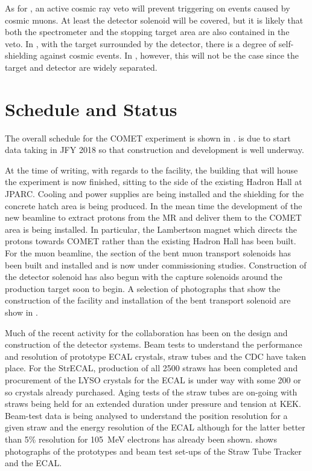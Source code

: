 As for \phaseI, an active cosmic ray veto will prevent triggering on events caused by cosmic muons.
At least the detector solenoid will be covered, but it is likely that both the spectrometer and the stopping target area are also contained in the veto.
In \phaseI, with the target surrounded by the detector, there is a degree of self-shielding against cosmic events. 
In \phaseII, however, this will not be the case since the target and detector are widely separated.


\section{Schedule and Status}
\FigSchedule
The overall schedule for the COMET experiment is shown in .
\phaseI is due to start data taking in \ac{JFY} 2018 so that construction and development is well underway.

\FigStatusFacility
At the time of writing, with regards to the facility, the building that will house the experiment is now finished, sitting to the side of the existing Hadron Hall at \ac{JPARC}.
Cooling and power supplies are being installed and the shielding for the concrete hatch area is being produced.
In the mean time the development of the new beamline to extract protons from the \ac{MR} and deliver them to the COMET area is being installed.
In particular, the Lambertson magnet which directs the protons towards COMET rather than the existing Hadron Hall has been built.
For the muon beamline, the \phaseI section of the bent muon transport solenoids has been built and installed and is now under commissioning studies.
Construction of the detector solenoid has also begun with the capture solenoids around the production target soon to begin.
A selection of photographs that show the construction of the facility and installation of the bent transport solenoid are show in .

\FigStatusStrECAL
Much of the recent activity for the collaboration has been on the design and construction of the detector systems.
Beam tests to understand the performance and resolution of prototype ECAL crystals, straw tubes and the \ac{CDC} have taken place.
For the \ac{StrECAL}, production of all 2500 \phaseI straws has been completed and procurement of the \ac{LYSO} crystals for the ECAL is under way with some 200 or so crystals already purchased.
Aging tests of the straw tubes are on-going with straws being held for an extended duration under pressure and tension at KEK.
Beam-test data is being analysed to understand the position resolution for a given straw and the energy resolution of the ECAL although for the latter better than 5\% resolution for 105~MeV electrons has already been shown.
 shows photographs of the prototypes and beam test set-ups of the Straw Tube Tracker and the ECAL.

